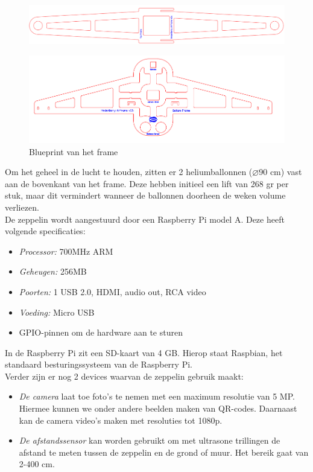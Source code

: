 \documentclass[eind]{penoverslag}
\begin{document}
\begin{figure}[h!]
\centering
\includegraphics[scale=0.3]{upperFrame.png}
\label{frame}
\end{figure}

\begin{figure}[h!]
\centering
\includegraphics[scale=0.3]{lowerFrame.png}
\caption{Blueprint van het frame}
\label{frame}
\end{figure}

Om het geheel in de lucht te houden, zitten er 2 heliumballonnen ($\diameter$90 cm) vast aan de bovenkant van het frame. Deze hebben initieel een lift van 268 gr per stuk, maar dit vermindert wanneer de ballonnen doorheen de weken volume verliezen. \\

De zeppelin wordt aangestuurd door een Raspberry Pi model A. Deze heeft volgende specificaties: 
\begin{itemize}
	\item \emph{Processor:} 700MHz ARM
	\item \emph{Geheugen:} 256MB 
	\item \emph{Poorten:} 1 USB 2.0, HDMI, audio out, RCA video
	\item \emph{Voeding:} Micro USB
	\item GPIO-pinnen om de hardware aan te sturen
\end{itemize}

In de Raspberry Pi zit een SD-kaart van 4 GB. Hierop staat Raspbian, het standaard besturingssysteem van de Raspberry Pi. \\

Verder zijn er nog 2 devices waarvan de zeppelin gebruik maakt:
\begin{itemize}
	\item \emph{De camera} laat toe foto's te nemen met een maximum resolutie van 5 MP. Hiermee kunnen we onder andere beelden maken van QR-codes. Daarnaast kan de camera video's maken met resoluties tot 1080p. 
	\item \emph{De afstandssensor} kan worden gebruikt om met ultrasone trillingen de afstand te meten tussen de zeppelin en de grond of muur. Het bereik gaat van 2-400 cm. \\
\end{itemize}
\end{document}
